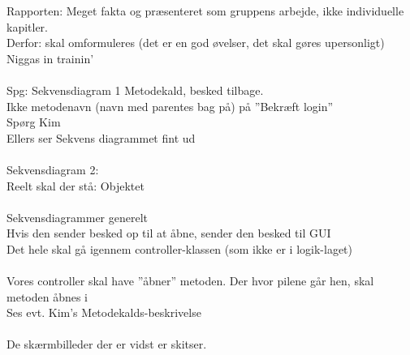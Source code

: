 Rapporten: Meget fakta og præsenteret som gruppens arbejde, ikke individuelle kapitler.\\
	Derfor: skal omformuleres (det er en god øvelser, det skal gøres upersonligt)
	Niggas in trainin’
\\
\\
Spg: Sekvensdiagram 1
	Metodekald, besked tilbage.	\\
Ikke metodenavn (navn med parentes bag på) på ”Bekræft login”\\
Spørg Kim\\
Ellers ser Sekvens diagrammet fint ud
\\
\\

Sekvensdiagram 2:\\
	Reelt skal der stå: Objektet
\\
\\
Sekvensdiagrammer generelt\\
	Hvis den sender besked op til at åbne, sender den besked til GUI\\
	Det hele skal gå igennem controller-klassen (som ikke er i logik-laget)
\\
\\

Vores controller skal have ”åbner” metoden.
Der hvor pilene går hen, skal metoden åbnes i\\
Ses evt. Kim’s Metodekalds-beskrivelse
\\
\\

De skærmbilleder der er vidst er skitser.











